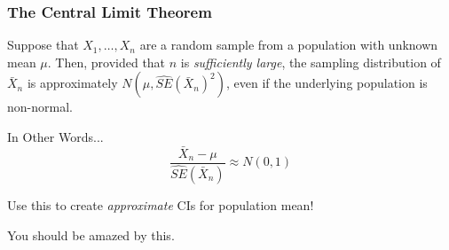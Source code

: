 \documentclass[handout]{beamer}
\begin{document}
\begin{frame}
\frametitle{The Central Limit Theorem}
Suppose that $X_1, \hdots, X_n$ are a random sample from a population with unknown mean $\mu$. Then, provided that $n$ is \alert{\emph{sufficiently large}}, the sampling distribution of $\bar{X}_n$ is approximately $N\left(\mu, \widehat{SE}(\bar{X}_n)^2\right)$, even if the underlying population is \alert{non-normal}.

\begin{block}{In Other Words...}
	$$\frac{\bar{X}_n -\mu}{\widehat{SE}(\bar{X}_n)} \approx N(0,1)$$
\end{block}

\begin{alertblock}{Use this to create \emph{approximate} CIs for population mean!}
\end{alertblock}
\end{frame}
\begin{frame}
\begin{center}\Huge You should be amazed by this.\end{center}
\end{frame}
\end{document}
